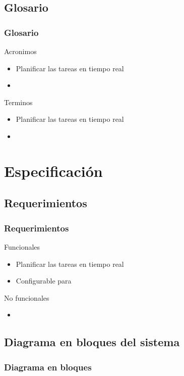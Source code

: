 \subsection{Glosario}
\begin{frame}
	\frametitle{Glosario}
	\begin{block}{Acronimos}
		\begin{itemize}
			\item Planificar las tareas en tiempo real
			\item 
		\end{itemize}
	\end{block}
	\begin{block}{Terminos}
		\begin{itemize}
			\item Planificar las tareas en tiempo real
			\item 
		\end{itemize}
	\end{block}
\end{frame}

\section{Especificación}

\subsection{Requerimientos}
\begin{frame}
	\frametitle{Requerimientos}
	\begin{block}{Funcionales}
		\begin{itemize}
			\item Planificar las tareas en tiempo real
			\item Configurable para 
		\end{itemize}
	\end{block}

	\begin{block}{No funcionales}
		\begin{itemize}
			\item 
		\end{itemize}
	\end{block}

\end{frame}

\subsection{Diagrama en bloques del sistema}
\begin{frame}
	\frametitle{Diagrama en bloques}
\end{frame}

